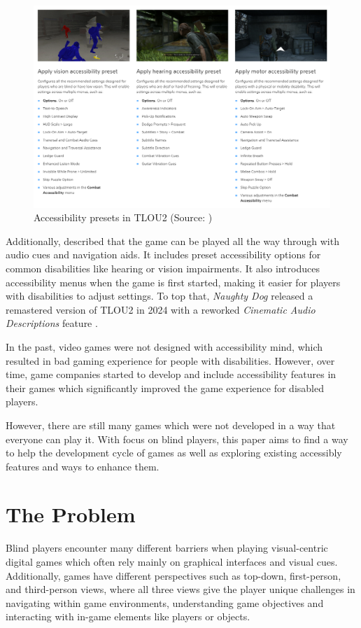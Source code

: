 \documentclass[sigconf,natbib=false,10pt]{acmart}
\begin{document}
	\begin{figure}[ht]
		\centering
		\includegraphics[scale=0.6,width=\textwidth]{assets/tlou-accessibility-presets.png}
		\caption{Accessibility presets in TLOU2 (Source: \textcite{playstation_last_2020-1})}
		\label{fig:tlou-accessibility-presets}
	\end{figure}

	Additionally, \textcite{dale_last_2024} described that the game can be played all the way through with audio cues and navigation aids.
	It includes preset accessibility options for common disabilities like hearing or vision impairments. 
	It also introduces accessibility menus when the game is first started, making it easier for players with disabilities to adjust settings.
	To top that, \emph{Naughty Dog} released a remastered version of TLOU2 in 2024 with a reworked \emph{Cinematic Audio Descriptions} feature \cite{playstation_last_2024}.
	
	In the past, video games were not designed with accessibility mind, which resulted in bad gaming experience for people with disabilities. 
	However, over time, game companies started to develop and include accessibility features in their games which significantly improved the game experience for disabled players.
	
	However, there are still many games which were not developed in a way that everyone can play it.
	With focus on blind players, this paper aims to find a way to help the development cycle of games as well as exploring existing accessibly features and ways to enhance them.
	
	\section{The Problem} \label{sec:theProblem}
	Blind players encounter many different barriers when playing visual-centric digital games which often rely mainly on graphical interfaces and visual cues. 
	Additionally, games have different perspectives such as top-down, first-person, and third-person views, where all three views give the player unique challenges in navigating within game environments, understanding game objectives and interacting with in-game elements like players or objects.
	
\end{document}
